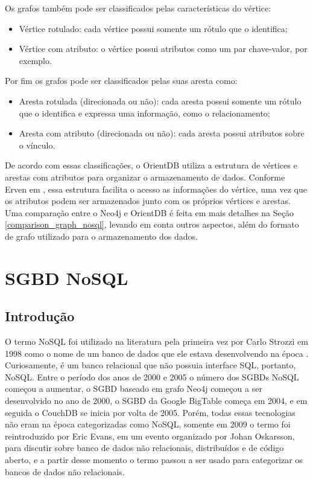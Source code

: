 	Os grafos também pode ser classificados pelas características do vértice:
\begin{itemize}
		\item Vértice rotulado: cada vértice possui somente um rótulo que o identifica;
		\item Vértice com atributo: o vértice possui atributos como um par chave-valor, por exemplo.
\end{itemize}

	Por fim os grafos pode ser classificados pelas suas aresta como:
\begin{itemize}
		\item Aresta rotulada (direcionada ou não): cada aresta possui somente um rótulo que o identifica e expressa uma informação, como o relacionamento;
		\item Aresta com atributo (direcionada ou não): cada aresta possui atributos sobre o vínculo.
\end{itemize}

	De acordo com essas classificações, o OrientDB utiliza a estrutura de vértices e arestas com atributos para organizar o armazenamento de dados. Conforme Erven em \cite{mdgnosql}, essa estrutura facilita o acesso as informações do vértice, uma vez que os atributos podem ser armazenados junto com os próprios vértices e arestas. Uma comparação entre o Neo4j e OrientDB é feita em mais detalhes na Seção \ref{comparison_graph_nosql}, levando em conta outros aspectos, além do formato de grafo utilizado para o armazenamento dos dados.
	
\section{SGBD NoSQL}
	
\subsection{Introdução}
	O termo NoSQL foi utilizado na literatura pela primeira vez por Carlo Strozzi em 1998 como o nome de um banco de dados que ele estava desenvolvendo na época \cite{FirstNoSQL}. Curiosamente, é um banco relacional que não possuia interface SQL, portanto, NoSQL. Entre o período dos anos de 2000 e 2005 o número dos SGBDs NoSQL começou a aumentar, o SGBD baseado em grafo Neo4j começou a ser desenvolvido no ano de 2000, o SGBD da Google BigTable\cite{Chang:2008:BDS:1365815.1365816} começa em 2004, e em seguida o CouchDB se inicia por volta de 2005. Porém, todas essas tecnologias não eram na época categorizadas como NoSQL, somente em 2009 o termo foi reintroduzido por Eric Evans, em um evento organizado por Johan Oskarsson, para discutir sobre banco de dados não relacionais, distribuídos e de código aberto, e a partir desse momento o termo passou a ser usado para categorizar os bancos de dados não relacionais.
	
